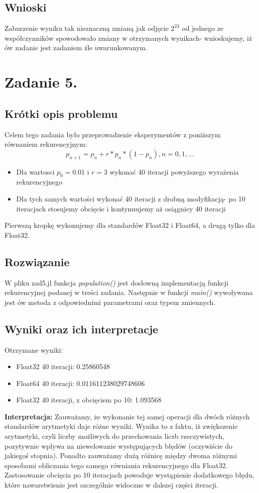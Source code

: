 \documentclass[a4paper,14pt]{report}
\begin{document}
  \section{Wnioski}
    Zaburzenie wyniku tak nieznaczną zmianą jak odjęcie $2^{23}$ od jednego ze współczynników spowodowało zmiany w otrzymanych wynikach- wnioskujemy, iż ów zadanie jest zadaniem źle uwarunkowanym. 

\chapter{Zadanie 5.}
  \section{Krótki opis problemu}
    Celem tego zadania było przeprowadzenie eksperymentów z poniższym równaniem rekurencyjnym:
    \begin{equation}
      p_{n+1} = p_{n} + r * p_{n} * (1-p_{n}),  n=0,1,...
    \end{equation}
    \begin{itemize}
      \item Dla wartosci $p_{0}=0.01$ i $r=3$ wykonać 40 iteracji powyższego wyrażenia rekurencyjnego
      \item Dla tych samych wartości wykonać 40 iteracji z drobną modyfikacją- po 10 iteracjach stosujemy obcięcie i kontynuujemy aż osiągniey 40 iteracji
    \end{itemize}
    Pierwszą kropkę wykonujemy dla standardów Float32 i Float64, a drugą tylko dla Float32.
  \section{Rozwiązanie}
    W pliku zad5.jl funkcja \textit{population()} jest dosłowną implementacją funkcji rekurencyjnej podanej w treści zadania. Następnie w funkcji \textit{main()} wywoływana jest ów metoda z odpowiednimi parametrami oraz typem zmiennych.
  \section{Wyniki oraz ich interpretacje}
    Otrzymane wyniki:
    \begin{itemize}
      \item Float32 40 iteracji: 0.25860548
      \item Float64 40 iteracji: 0.011611238029748606
      \item Float32 40 iteracji, z obcięciem po 10: 1.093568
    \end{itemize}
    \textbf{Interpretacja:} Zauważamy, że wykonanie tej samej operacji dla dwóch różnych standardów arytmetyki daje różne wyniki. Wynika to z faktu, iż zwiększenie arytmetyki, czyli liczby możliwych do przechowania liczb rzeczywistych, pozytywnie wpływa na niewelowanie występujących błędów (oczywiście do jakiegoś stopnia). Ponadto zauważamy dużą różnicę między dwoma różnymi sposobami obliczania tego samego równiania rekurencyjnego dla Float32. Zastosowanie obcięcia po 10 iteracjach powoduje wystąpienie dodatkowego błędu, które nawarstwienie jest szczególnie widoczne w dalszej części iteracji.
\end{document}
